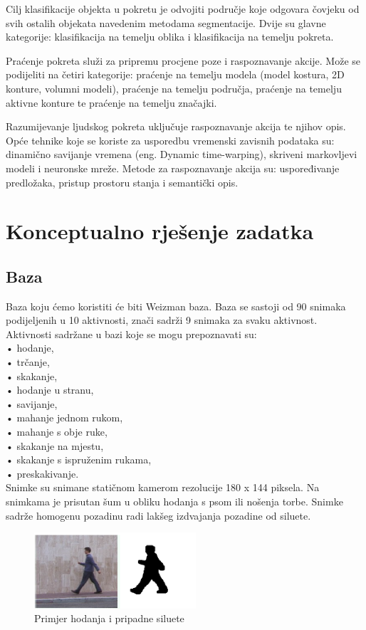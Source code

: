 \documentclass[times, utf8, diplomski]{fer}
\begin{document}
Cilj klasifikacije objekta u pokretu je odvojiti područje koje odgovara čovjeku od svih ostalih
objekata navedenim metodama segmentacije. Dvije su glavne kategorije: klasifikacija na
temelju oblika i klasifikacija na temelju pokreta.

Praćenje pokreta služi za pripremu procjene poze i raspoznavanje akcije. Može se podijeliti na
četiri kategorije: praćenje na temelju modela (model kostura, 2D konture, volumni modeli),
praćenje na temelju područja, praćenje na temelju aktivne konture te praćenje na temelju
značajki.

Razumijevanje ljudskog pokreta uključuje raspoznavanje akcija te njihov opis. Opće tehnike
koje se koriste za usporedbu vremenski zavisnih podataka su: dinamično savijanje vremena
(eng. Dynamic time-warping), skriveni markovljevi modeli i neuronske mreže. Metode za
raspoznavanje akcija su: uspoređivanje predložaka, pristup prostoru stanja i semantički opis.

\section{Konceptualno rješenje zadatka}

\subsection{Baza}

Baza koju ćemo koristiti će biti Weizman baza. Baza se sastoji od 90 snimaka podijeljenih u
10 aktivnosti, znači sadrži 9 snimaka za svaku aktivnost. Aktivnosti sadržane u bazi koje se
mogu prepoznavati su: \\
• hodanje, \\
• trčanje, \\
• skakanje, \\
• hodanje u stranu, \\
• savijanje, \\
• mahanje jednom rukom, \\
• mahanje s obje ruke, \\
• skakanje na mjestu, \\
• skakanje s ispruženim rukama, \\
• preskakivanje. \\

Snimke su snimane statičnom kamerom rezolucije 180 x 144 piksela. Na snimkama je
prisutan šum u obliku hodanja s psom ili nošenja torbe. Snimke sadrže homogenu pozadinu
radi lakšeg izdvajanja pozadine od siluete.
\newline
\begin{figure}[ht!]
\centering
\includegraphics[width=60mm]{walk.png}
\caption{ Primjer hodanja i pripadne siluete \label{overflow}}
\end{figure}
\end{document}
